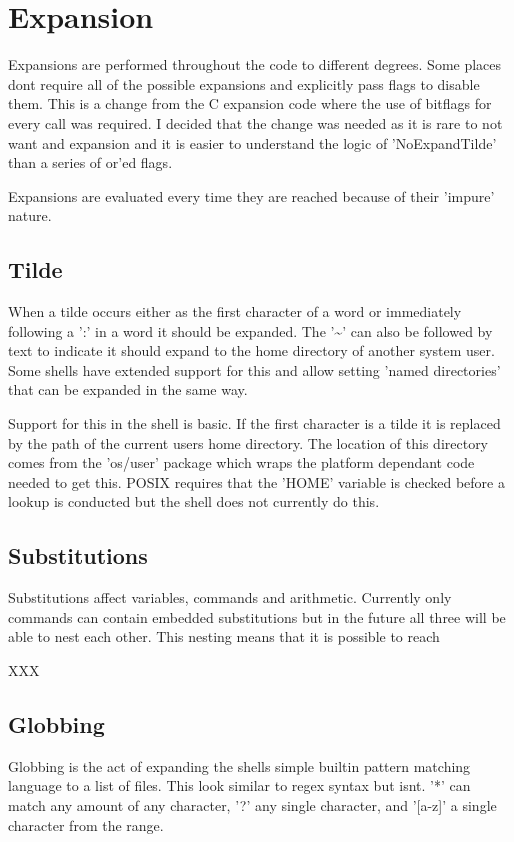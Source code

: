 \section{Expansion}
Expansions are performed throughout the code to different degrees.
Some places dont require all of the possible expansions and explicitly pass flags to disable them.
This is a change from the C expansion code where the use of bitflags for every call was required.
I decided that the change was needed as it is rare to not want and expansion and it is easier to understand the logic of
'NoExpandTilde' than a series of or'ed flags.

Expansions are evaluated every time they are reached because of their 'impure' nature.

\subsection{Tilde}
When a tilde occurs either as the first character of a word or immediately following a ':' in a word it should be expanded.
The '\textasciitilde' can also be followed by text to indicate it should expand to the home directory of another system user.
Some shells have extended support for this and allow setting 'named directories' that can be expanded in the same way.

Support for this in the shell is basic.
If the first character is a tilde it is replaced by the path of the current users home directory.
The location of this directory comes from the 'os/user' package which wraps the platform dependant code needed to get this.
POSIX requires that the 'HOME' variable is checked before a lookup is conducted but the shell does not currently do this.

\subsection{Substitutions}
\label{sec:substitution}
Substitutions affect variables, commands and arithmetic.
Currently only commands can contain embedded substitutions but in the future all three will be able to nest each other.
This nesting means that it is possible to reach

XXX
\subsection{Globbing}
Globbing is the act of expanding the shells simple builtin pattern matching language to a list of files.
This look similar to regex syntax but isnt.
'*' can match any amount of any character, '?' any single character, and '[a-z]' a single character from the range.

